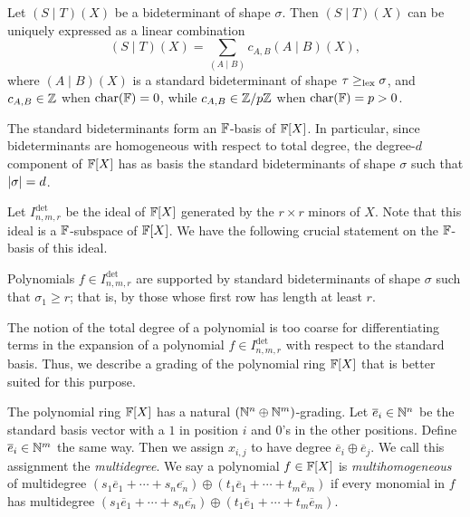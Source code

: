 \documentclass[letterpaper, 11pt]{amsart}
\newif\iffull
\begin{document}
\begin{thrm}\label{thrm:det_straightening}
  Let $(S \mid T)(X)$ be a bideterminant of shape $\sigma$.
  Then $(S \mid T)(X)$ can be uniquely expressed as a linear combination
  \[
    (S \mid T)(X) = \sum_{(A \mid B)} c_{A, B} (A \mid B)(X),
  \]
  where $(A \mid B)(X)$ is a standard bideterminant of shape $\tau \geq_{\operatorname{lex}} \sigma$, and $c_{A,B} \in \mathbb{Z}$ when $\operatorname{char}(\mathbb{F}) = 0$, while $c_{A,B} \in \mathbb{Z}/p\mathbb{Z}$ when $\operatorname{char}(\mathbb{F}) = p > 0$.
\end{thrm}

\iffull
The fact that bideterminants are homogeneous polynomials, together with \Cref{lem:det_monomial} and \Cref{thrm:det_straightening}, imply the following corollary.
\fi
\begin{cor}\label{cor:det-basis}
  The standard bideterminants form an $\mathbb{F}$-basis of $\mathbb{F}[X]$.
  In particular, since bideterminants are homogeneous with respect to total degree, the degree-$d$ component of $\mathbb{F}[X]$ has as basis the standard bideterminants of shape $\sigma$ such that $\abs{\sigma} = d$.
\end{cor}

Let $I^{\det}_{n, m, r}$ be the ideal of $\mathbb{F}[X]$ generated by the $r \times r$ minors of $X$.
Note that this ideal is a $\mathbb{F}$-subspace of $\mathbb{F}[X]$.
We have the following crucial statement on the $\mathbb{F}$-basis of this ideal.
\begin{prop}[{\cite[Corollary 1.7]{BC03}}]\label{prop:det_shape}
  Polynomials $f \in I^{\det}_{n, m, r}$ are supported by standard bideterminants of shape $\sigma$ such that $\sigma_1 \geq r$; that is, by those whose first row has length at least $r$.
\end{prop}

\iffull
The notion of the total degree of a polynomial is too coarse for differentiating terms in the expansion of a polynomial $f \in I^{\det}_{n, m, r}$ with respect to the standard basis.
Thus, we describe a grading of the polynomial ring $\mathbb{F}[X]$ that is better suited for this purpose.
\begin{defn}\label{defn:multideg}
    The polynomial ring $\mathbb{F}[X]$ has a natural $(\mathbb{N}^n \oplus \mathbb{N}^m)$-grading.
    Let $\overline{e}_i \in \mathbb{N}^n$ be the standard basis vector with a $1$ in position $i$ and $0$'s in the other positions.
    Define $\overline{e}_i \in \mathbb{N}^m$ the same way.
    Then we assign $x_{i, j}$ to have degree $\overline{e}_i \oplus \overline{e}_j$.
    We call this assignment the \emph{multidegree}.
    We say a polynomial $f \in \mathbb{F}[X]$ is \emph{multihomogeneous} of multidegree $(s_1 \overline{e}_1 + \cdots + s_n \overline{e_n}) \oplus (t_1 \overline{e}_1 + \cdots + t_m \overline{e}_m)$ if every monomial in $f$ has multidegree $(s_1 \overline{e}_1 + \cdots + s_n \overline{e_n}) \oplus (t_1 \overline{e}_1 + \cdots + t_m \overline{e}_m)$.
\end{defn}
\end{document}
